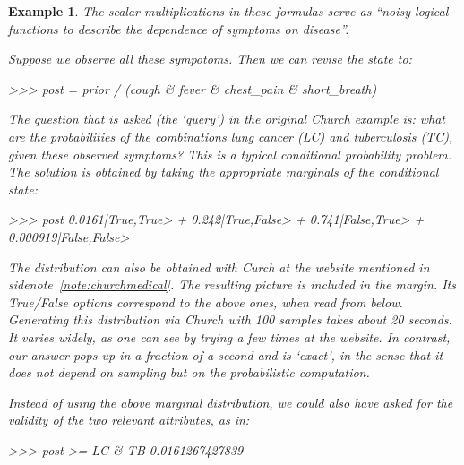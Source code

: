 \documentclass[leqno]{tufte-book} %
\newtheorem{example}[theorem]{Example}
\begin{document}
\begin{example}
\noindent The scalar multiplications in these formulas serve as
``noisy-logical functions to describe the dependence of symptoms on
disease''.

Suppose we observe all these sympotoms. Then we can revise
the state to:
\begin{python}
>>> post = prior / (cough & fever & chest_pain & short_breath)
\end{python}

\noindent The question that is asked (the `query') in the original
Church example is: what are the probabilities of the combinations lung
cancer (LC) and tuberculosis (TC), given these observed symptoms? This
is a typical conditional probability problem. The solution is obtained
by taking the appropriate marginals of the conditional state:
\begin{python}
>>> post %
0.0161|True,True> + 0.242|True,False> + 0.741|False,True> + 0.000919|False,False>
\end{python}

The distribution can also be obtained with Curch at the website
mentioned in sidenote~\ref{note:churchmedical}. The resulting picture
is included in the
margin.
Its True/False options correspond to the above ones, when read from
below. Generating this distribution via Church with 100 samples takes
about 20 seconds. It varies widely, as one can see by trying a few
times at the website. In contrast, our answer pops up in a fraction of
a second and is `exact', in the sense that it does not depend on
sampling but on the probabilistic computation.

Instead of using the above marginal distribution, we could also
have asked for the validity of the two relevant attributes, as in:
\begin{python}
>>> post >= LC & TB
0.0161267427839
\end{python}


\end{example}
\end{document}
